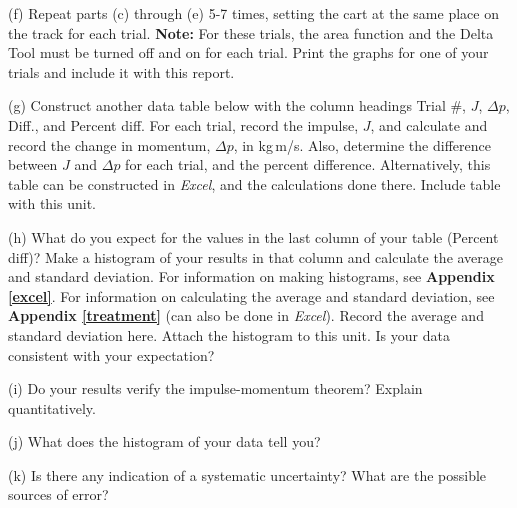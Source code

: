 (f) Repeat parts (c) through (e) 5-7 times, setting the cart at the same place on the track for each trial. \textbf{Note:} For these trials, the area function and the Delta Tool must be turned off and on for each trial. Print the graphs for one of your trials and include it with this report.

(g) Construct another data table below with the column headings
Trial \#, $J$, \( \Delta  p\), Diff., and Percent diff. For each trial, record
the impulse, $J$, and calculate and record the change in momentum, \( \Delta  p\), in kg\,m/s. Also, determine the difference between $J$ and $\Delta p$  for 
each trial, and the percent difference. Alternatively, this table can be constructed in \textit{Excel}, and the calculations done there. Include table with this unit.
\vspace{60mm}

(h) What do you expect for the values in the last column of your table (Percent diff)? Make a histogram of your results in that column and calculate the average and standard deviation. For information on making histograms, see \textbf{Appendix \ref{excel}}. For information on calculating the average and standard deviation, see \textbf{Appendix \ref{treatment}} (can also be done in \textit{Excel}). Record the average and standard 
deviation here. Attach the histogram to this unit. Is your data consistent with your expectation?
\vspace{15mm}

(i) Do your results verify the impulse-momentum theorem? Explain quantitatively.
\vspace{15mm}

(j) What does the histogram of your data tell you?
\vspace{15mm}

(k) Is there any indication of a systematic uncertainty? What are the possible
sources of error?

